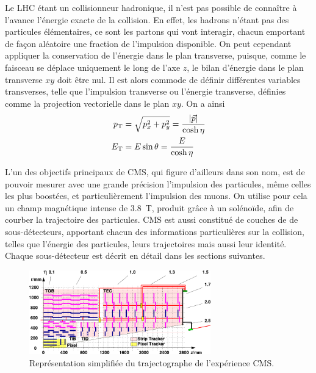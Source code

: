 Le LHC étant un collisionneur hadronique, il n'est pas possible de connaître à l'avance l'énergie exacte de la collision. En effet, les hadrons n'étant pas des particules élémentaires, ce sont les partons qui vont interagir, chacun emportant de façon aléatoire une fraction de l'impulsion disponible. On peut cependant appliquer la conservation de l'énergie dans le plan transverse, puisque, comme le faisceau se déplace uniquement le long de l'axe $z$, le bilan d'énergie dans le plan transverse $xy$ doit être nul. Il est alors commode de définir différentes variables transverses, telle que l'impulsion transverse ou l'énergie transverse, définies comme la projection vectorielle dans le plan $xy$. On a ainsi
\begin{align*}
  p_{\mathrm{T}} &= \sqrt{p_x^2 + p_y^2} = \frac{\lvert \vec{p} \rvert}{\cosh\eta} \\
  E_{\mathrm{T}} &= E \sin\theta = \frac{E}{\cosh\eta}
\end{align*}


L'un des objectifs principaux de CMS, qui figure d'ailleurs dans son nom, est de pouvoir mesurer avec une grande précision l'impulsion des particules, même celles les plus boostées, et particulièrement l'impulsion des muons. On utilise pour cela un champ magnétique intense de \SI{3.8}{\tesla}, produit grâce à un solénoïde, afin de courber la trajectoire des particules. CMS est aussi constitué de couches de de sous-détecteurs, apportant chacun des informations particulières sur la collision, telles que l'énergie des particules, leurs trajectoires mais aussi leur identité. Chaque sous-détecteur est décrit en détail dans les sections suivantes.

\begin{figure}[t] \centering
  \includegraphics[width=0.7\textwidth]{chapitre2/figs/tracker.pdf}
  \caption{Représentation simplifiée du trajectographe de l'expérience CMS.}
  \label{fig:tracker}
\end{figure}


